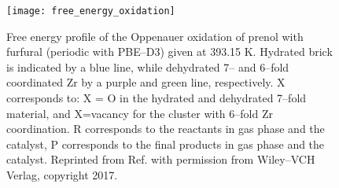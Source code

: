 \begin{figure}[ht]
	\texttt{[image: free\_energy\_oxidation]}
	\centering
	\caption[Free energy profile of the Oppenauer oxidation of prenol with furfural
	(periodic with PBE--D3) given at 393.15 K. Hydrated brick is indicated by a
	blue line, while dehydrated 7-- and 6--fold coordinated Zr by a purple and
	green line, respectively. X corresponds to: X = O in the hydrated and
	dehydrated 7--fold material, and X=vacancy for the cluster with 6--fold Zr coordination. R
	corresponds to the reactants in gas phase and the catalyst, P corresponds to
	the final products in gas phase and the catalyst.]{Free energy profile of the Oppenauer oxidation of prenol with
	furfural (periodic with PBE--D3) given at 393.15 K. Hydrated brick is indicated by a
	blue line, while dehydrated 7-- and 6--fold coordinated Zr by a purple and
	green line, respectively. X corresponds to: X = O in the hydrated and
	dehydrated 7--fold material, and X=vacancy for the cluster with 6--fold Zr coordination. R
	corresponds to the reactants in gas phase and the catalyst, P corresponds to
	the final products in gas phase and the catalyst. Reprinted from Ref.
	\cite{Hajek2017} with permission from Wiley--VCH Verlag, copyright 2017.}
	\label{fig:free_energy_oxidation}
\end{figure}


